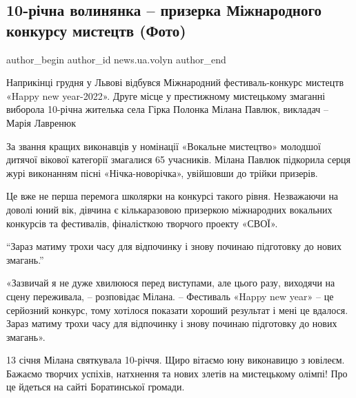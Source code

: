  
 
 
 
 
\subsection{10-річна волинянка – призерка Міжнародного конкурсу мистецтв (Фото)}
\label{sec:15_01_2022.stz.news.ua.volyn.1.konkurs_priz}
 
\ifcmt
 author_begin
   author_id news.ua.volyn
 author_end
\fi

\begin{zznagolos}
Наприкінці грудня у Львові відбувся Міжнародний фестиваль-конкурс мистецтв
«Happy new year-2022». Друге місце у престижному мистецькому змаганні виборола
10-річна жителька села Гірка Полонка Мілана Павлюк, викладач – Марія Лавренюк	
\end{zznagolos}

За звання кращих виконавців у номінації «Вокальне мистецтво» молодшої дитячої
вікової категорії змагалися 65 учасників. Мілана Павлюк підкорила серця журі
виконанням пісні «Нічка-новорічка», увійшовши до трійки призерів.


Це вже не перша перемога школярки на конкурсі такого рівня. Незважаючи на
доволі юний вік, дівчина є кількаразовою призеркою міжнародних вокальних
конкурсів та фестивалів, фіналісткою творчого проекту «СВОЇ».

\begin{zznagolos}
\enquote{Зараз матиму трохи часу для відпочинку і знову починаю підготовку до нових
змагань.}
\end{zznagolos}

«Зазвичай я не дуже хвилююся перед виступами, але цього разу, виходячи на сцену
переживала, – розповідає Мілана. – Фестиваль «Happy new year» – це серйозний
конкурс, тому хотілося показати хороший результат і мені це вдалося. Зараз
матиму трохи часу для відпочинку і знову починаю підготовку до нових змагань».


13 січня Мілана святкувала 10-річчя. Щиро вітаємо юну виконавицю з ювілеєм.
Бажаємо творчих успіхів, натхнення та нових злетів на мистецькому олімпі! Про
це йдеться на сайті Боратинської громади.
